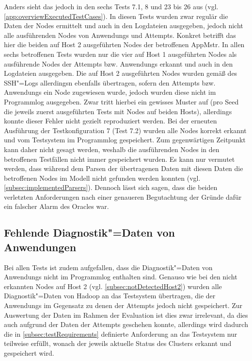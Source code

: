 Anders sieht das jedoch in den sechs \glspl{Test} 7.1, 8 und 23 bis 26 aus (vgl. \cref{app:overviewExecutedTestCases}).
In diesen \glspl{Test} wurden zwar regulär die Daten der Nodes ermittelt und auch in den Logdateien ausgegeben, jedoch nicht alle ausführenden Nodes von \glspl{Anwendung} und Attempts.
Konkret betrifft das hier die beiden auf Host 2 ausgeführten Nodes der betroffenen \gls{AppMstr}.
In allen sechs betroffenen \glspl{Test} wurden nur die vier auf Host 1 ausgeführten Nodes als ausführende Nodes der \glspl{Attempt} bzw. \glspl{Anwendung} erkannt und auch in den Logdateien ausgegeben.
Die auf Host 2 ausgeführten Nodes wurden gemäß des SSH"=Logs allerdingsn ebenfalls übertragen, sofern den \glspl{Attempt} bzw. \glspl{Anwendung} ein Node zugewiesen wurde, jedoch wurden diese nicht im Programmlog ausgegeben.
Zwar tritt hierbei ein gewisses Muster auf (pro Seed die jeweils zuerst ausgeführten \glspl{Test} mit Nodes auf beiden Hosts), allerdings konnte dieser Fehler nicht gezielt reproduziert werden.
Bei der erneuten Ausführung der \gls{Testkonfiguration} 7 (Test 7.2) wurden alle Nodes korrekt erkannt und vom Testsystem im Programmlog gespeichert.
Zum gegenwärtigen Zeitpunkt kann daher nicht gesagt werden, weshalb die ausführenden Nodes in den betroffenen Testfällen nicht immer gespeichert wurden.
Es kann nur vermutet werden, dass während dem Parsen der übertragenen Daten mit diesen Daten die betroffenen Nodes im Modell nicht gefunden werden konnten (vgl. \cref{subsec:implementedParsers}).
Dennoch lässt sich sagen, dass die beiden verletzten Anforderungen nach einer genaueren Begutachtung der Gründe dafür ein falscher Alarm des Oracles war.

\subsection{Fehlende Diagnostik"=Daten von Anwendungen}
\label{subsec:notSavedAppDiagnostics}

Bei allen \glspl{Test} ist zudem aufgefallen, dass die Diagnostik"=Daten von \glspl{Anwendung} nicht im Programmlog enthalten sind.
Genauso wie bei den nicht erkannten Nodes auf Host 2 (vgl. \cref{subsec:notDetectedHost2}) wurden alle Diagnostik"=Daten von Hadoop an das Testsystem übertragen, die der \glspl{Anwendung} im Gegensatz zu denen der \glspl{Attempt} jedoch nicht gespeichert.
Zur Auswertung der Daten im Rahmen der Evaluation ist dies zwar irrelevant, da dies auch aufgrund der Daten der \glspl{Attempt} geschehen konnte, allerdings wird dadurch die in \cref{subsec:testRequirements} definierte Anforderung an das Testsystem nur teilweise erfüllt, wonach der jeweils aktuelle Status des Clusters erkannt und gespeichert wird.

